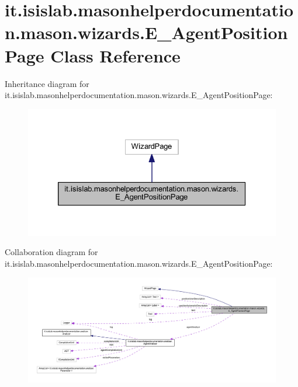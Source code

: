 \hypertarget{classit_1_1isislab_1_1masonhelperdocumentation_1_1mason_1_1wizards_1_1_e___agent_position_page}{\section{it.\-isislab.\-masonhelperdocumentation.\-mason.\-wizards.\-E\-\_\-\-Agent\-Position\-Page Class Reference}
\label{classit_1_1isislab_1_1masonhelperdocumentation_1_1mason_1_1wizards_1_1_e___agent_position_page}
}


Inheritance diagram for it.\-isislab.\-masonhelperdocumentation.\-mason.\-wizards.\-E\-\_\-\-Agent\-Position\-Page\-:\nopagebreak
\begin{figure}[H]
\begin{center}
\leavevmode
\includegraphics[width=326pt]{classit_1_1isislab_1_1masonhelperdocumentation_1_1mason_1_1wizards_1_1_e___agent_position_page__inherit__graph}
\end{center}
\end{figure}


Collaboration diagram for it.\-isislab.\-masonhelperdocumentation.\-mason.\-wizards.\-E\-\_\-\-Agent\-Position\-Page\-:\nopagebreak
\begin{figure}[H]
\begin{center}
\leavevmode
\includegraphics[width=350pt]{classit_1_1isislab_1_1masonhelperdocumentation_1_1mason_1_1wizards_1_1_e___agent_position_page__coll__graph}
\end{center}
\end{figure}
